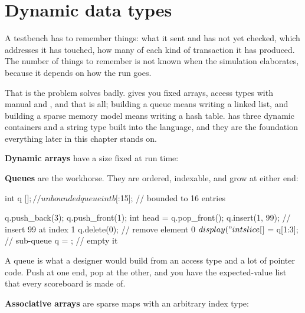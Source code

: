 \section{Dynamic data types}
\label{sec:beyond:dyn}
\label{sec:toolkit:dyn}

A testbench has to remember things: what it sent and has not yet checked,
which addresses it has touched, how many of each kind of transaction it has
produced. The number of things to remember is not known when the simulation
elaborates, because it depends on how the run goes.

That is the problem \VHDL{} solves badly. \VHDL{} gives you fixed arrays,
access types with manual  and , and that is all;
building a queue means writing a linked list, and building a sparse memory
model means writing a hash table. \SV{} has three dynamic containers and a
string type built into the language, and they are the foundation everything
later in this chapter stands on.

\textbf{Dynamic arrays} have a size fixed at run time:


\textbf{Queues} are the workhorse. They are ordered, indexable, and grow at
either end:

\begin{svcode}
int q [$];                    // unbounded queue
int b [$:15];                 // bounded to 16 entries

q.push_back(3); q.push_front(1);
int head = q.pop_front();
q.insert(1, 99);              // insert 99 at index 1
q.delete(0);                  // remove element 0
$display("%
int slice [$] = q[1:3];       // sub-queue
q = {};                       // empty it
\end{svcode}

A queue is what a \VHDL{} designer would build from an access type and a lot
of pointer code. Push at one end, pop at the other, and you have the
expected-value list that every scoreboard is made of.

\textbf{Associative arrays} are sparse maps with an arbitrary index type:

